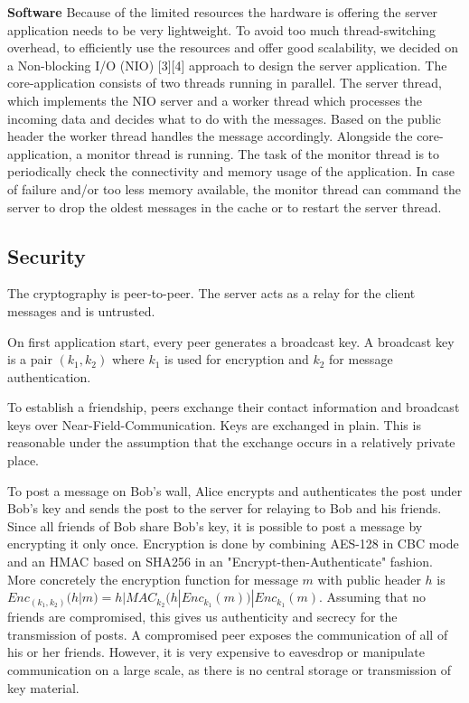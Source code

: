 \documentclass{report}
\begin{document}
\textbf{Software}\newline
\indent Because of the limited resources the hardware is offering the server application needs to be very lightweight. To avoid too much thread-switching overhead, to efficiently use the resources and offer good scalability, we decided on a Non-blocking I/O (NIO) [3][4] approach to design the server application. The core-application consists of two threads running in parallel. The server thread, which implements the NIO server and a worker thread which processes the incoming data and decides what to do with the messages. Based on the public header the worker thread handles the message accordingly.
Alongside the core-application, a monitor thread is running. The task of the monitor thread is to periodically check the connectivity and memory usage of the application. In case of failure and/or too less memory available, the monitor thread can command the server to drop the oldest messages in the cache or to restart the server thread. 

\subsection{Security}
The cryptography is peer-to-peer. The server acts as a relay for the client messages and is untrusted.

On first application start, every peer generates a broadcast key. A broadcast key is a pair $(k_1, k_2)$ where $k_1$ is used for encryption and $k_2$ for message authentication.

To establish a friendship, peers exchange their contact information and broadcast keys over Near-Field-Communication. Keys are exchanged in plain. This is reasonable under the assumption that the exchange occurs in a relatively private place.

To post a message on Bob's wall, Alice encrypts and authenticates the post under Bob's key and sends the post to the server for relaying to Bob and his friends. Since all friends of Bob share Bob's key, it is possible to post a message by encrypting it only once. Encryption is done by combining AES-128 in CBC mode and an HMAC based on SHA256 in an "Encrypt-then-Authenticate" fashion. More concretely the encryption function for message $m$ with public header $h$ is \newline
$Enc_{(k_1, k_2)}(h|m) = h | MAC_{k_2}(h | Enc_{k_1}(m)) | Enc_{k_1}(m)$.
\newline
Assuming that no friends are compromised, this gives us authenticity and secrecy for the transmission of posts. A compromised peer exposes the communication of all of his or her friends. However, it is very expensive to eavesdrop or manipulate communication on a large scale, as there is no central storage or transmission of key material.
\end{document}
